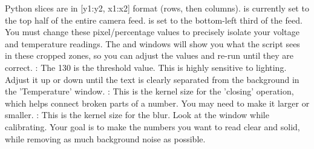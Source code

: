 {}\markdownRendererInterblockSeparator
{}Python slices are in [y1:y2, x1:x2] format (rows, then columns).\markdownRendererParagraphSeparator
{} is currently set to the top half of the entire camera feed.\markdownRendererParagraphSeparator
{} is set to the bottom-left third of the feed.\markdownRendererParagraphSeparator
{}You must change these pixel/percentage values to precisely isolate your voltage and temperature readings. The  and  windows will show you what the script sees in these cropped zones, so you can adjust the values and re-run until they are correct.\markdownRendererInterblockSeparator
{}
\markdownRendererSectionEnd \markdownRendererSectionBegin
{}\markdownRendererInterblockSeparator
{}\markdownRendererUlBeginTight
\markdownRendererUlItem {}\markdownRendererUlItemEnd 
\markdownRendererUlEndTight \markdownRendererInterblockSeparator
{}\markdownRendererInterblockSeparator
{}\markdownRendererSectionBegin
\markdownRendererSectionBegin
{}\markdownRendererInterblockSeparator
{}\markdownRendererUlBegin
\markdownRendererUlItem {}: The 130 is the threshold value. This is highly sensitive to lighting. Adjust it up or down until the text is clearly separated from the background in the 'Temperature' window.\markdownRendererUlItemEnd 
\markdownRendererUlItem {}: This is the kernel size for the 'closing' operation, which helps connect broken parts of a number. You may need to make it larger or smaller.\markdownRendererUlItemEnd 
\markdownRendererUlItem {}: This is the kernel size for the blur.\markdownRendererUlItemEnd 
\markdownRendererUlEnd \markdownRendererInterblockSeparator
{}Look at the  window while calibrating. Your goal is to make the numbers you want to read clear and solid, while removing as much background noise as possible.\markdownRendererParagraphSeparator
